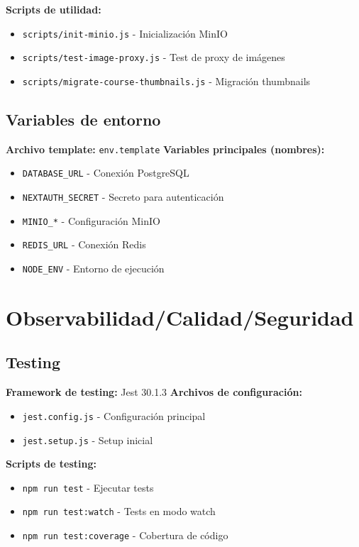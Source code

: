 \documentclass[12pt,a4paper]{article}
\begin{document}
\begin{enumerate}
\textbf{Scripts de utilidad:}
\begin{itemize}
    \item \texttt{scripts/init-minio.js} - Inicialización MinIO
    \item \texttt{scripts/test-image-proxy.js} - Test de proxy de imágenes
    \item \texttt{scripts/migrate-course-thumbnails.js} - Migración thumbnails
\end{itemize}

\subsection{Variables de entorno}

\textbf{Archivo template:} \texttt{env.template}
\textbf{Variables principales (nombres):}
\begin{itemize}
    \item \texttt{DATABASE\_URL} - Conexión PostgreSQL
    \item \texttt{NEXTAUTH\_SECRET} - Secreto para autenticación
    \item \texttt{MINIO\_*} - Configuración MinIO
    \item \texttt{REDIS\_URL} - Conexión Redis
    \item \texttt{NODE\_ENV} - Entorno de ejecución
\end{itemize}

\section{Observabilidad/Calidad/Seguridad}

\subsection{Testing}

\textbf{Framework de testing:} Jest 30.1.3
\textbf{Archivos de configuración:}
\begin{itemize}
    \item \texttt{jest.config.js} - Configuración principal
    \item \texttt{jest.setup.js} - Setup inicial
\end{itemize}
\textbf{Scripts de testing:}
\begin{itemize}
    \item \texttt{npm run test} - Ejecutar tests
    \item \texttt{npm run test:watch} - Tests en modo watch
    \item \texttt{npm run test:coverage} - Cobertura de código
\end{itemize}


\end{enumerate}
\end{document}
